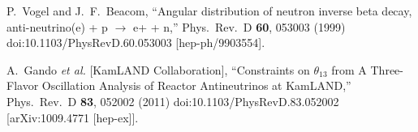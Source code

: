\documentclass[12pt]{article}
\begin{document}
\begin{thebibliography}{99}

  P.~Vogel and J.~F.~Beacom,
  ``Angular distribution of neutron inverse beta decay, anti-neutrino(e) +
  p $\rightarrow$ e+ + n,''
  Phys.\ Rev.\ D {\bf 60}, 053003 (1999)
  doi:10.1103/PhysRevD.60.053003
  [hep-ph/9903554].

  A.~Gando {\it et al.} [KamLAND Collaboration],
  ``Constraints on $\theta_{13}$ from A Three-Flavor Oscillation Analysis of Reactor Antineutrinos at KamLAND,''
  Phys.\ Rev.\ D {\bf 83}, 052002 (2011)
  doi:10.1103/PhysRevD.83.052002
  [arXiv:1009.4771 [hep-ex]].

\end{thebibliography}
\end{document}
